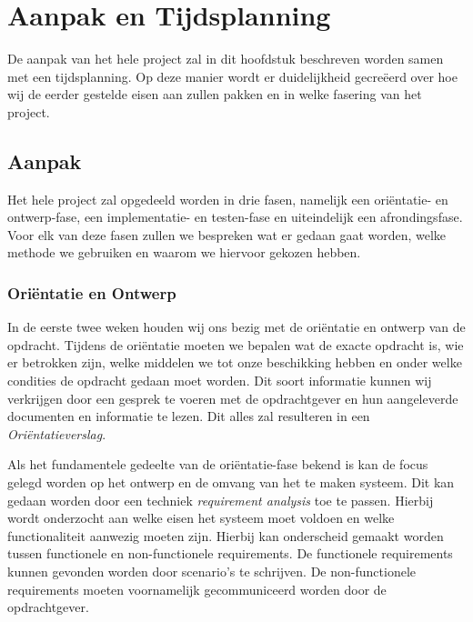 \section{Aanpak en Tijdsplanning}
De aanpak van het hele project zal in dit hoofdstuk beschreven worden samen met een tijdsplanning. Op deze manier wordt er duidelijkheid gecre\"eerd over hoe wij de eerder gestelde eisen aan zullen pakken en in welke fasering van het project.

\subsection{Aanpak}
Het hele project zal opgedeeld worden in drie fasen, namelijk een ori\"entatie- en ontwerp-fase, een implementatie- en testen-fase en uiteindelijk een afrondingsfase. Voor elk van deze fasen zullen we bespreken wat er gedaan gaat worden, welke methode we gebruiken en waarom we hiervoor gekozen hebben.

\subsubsection{Ori\"entatie en Ontwerp}
In de eerste twee weken houden wij ons bezig met de ori\"entatie en ontwerp van de opdracht. Tijdens de ori\"entatie moeten we bepalen wat de exacte opdracht is, wie er betrokken zijn, welke middelen we tot onze beschikking hebben en onder welke condities de opdracht gedaan moet worden. Dit soort informatie kunnen wij verkrijgen door een gesprek te voeren met de opdrachtgever en hun aangeleverde documenten en informatie te lezen. Dit alles zal resulteren in een \emph{Ori\"entatieverslag}.

Als het fundamentele gedeelte van de ori\"entatie-fase bekend is kan de focus gelegd worden op het ontwerp en de omvang van het te maken systeem. Dit kan gedaan worden door een techniek \emph{requirement analysis} toe te passen. Hierbij wordt onderzocht aan welke eisen het systeem moet voldoen en welke functionaliteit aanwezig moeten zijn. Hierbij kan onderscheid gemaakt worden tussen functionele en non-functionele requirements. De functionele requirements kunnen gevonden worden door scenario's te schrijven. De non-functionele requirements moeten voornamelijk gecommuniceerd worden door de opdrachtgever.

